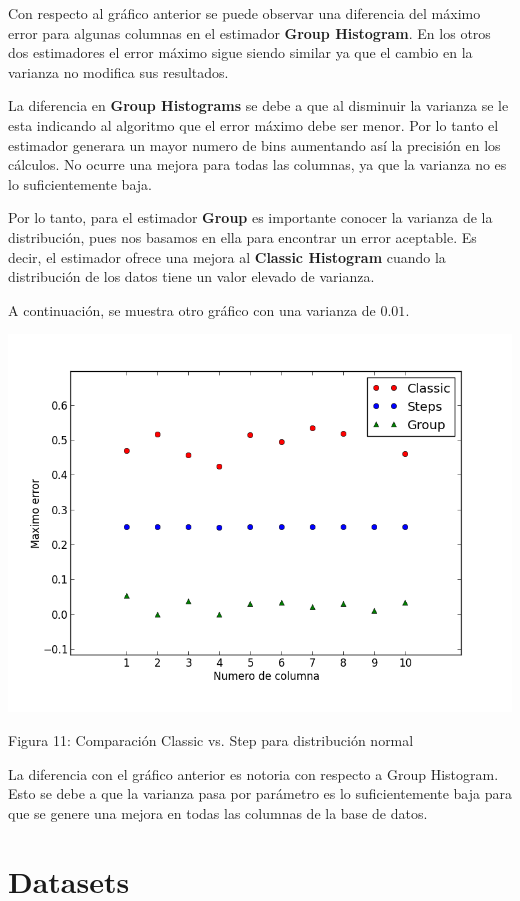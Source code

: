 \documentclass[10pt, a4paper,english,spanish,hidelinks]{article}
\begin{document}
Con respecto al gráfico anterior se puede observar una diferencia del máximo error para algunas columnas en el estimador \textbf{Group Histogram}. En los otros dos estimadores el error máximo sigue siendo similar ya que el cambio en la varianza no modifica sus resultados. 

La diferencia en \textbf{Group Histograms} se debe a que al disminuir la varianza se le esta indicando al algoritmo que el error máximo debe ser menor. Por lo tanto el estimador generara un mayor numero de bins aumentando así la precisión en los cálculos. No ocurre una mejora para todas las columnas, ya que la varianza no es lo suficientemente baja. 

Por lo tanto, para el estimador \textbf{Group} es importante conocer la varianza de la distribución, pues nos
basamos en ella para encontrar un error aceptable. Es decir, el estimador ofrece una mejora al \textbf{Classic Histogram} cuando la distribución de los datos tiene un valor elevado de varianza.

A continuación, se muestra otro gráfico con una varianza de $0.01$.


\centerline{  \includegraphics[scale=0.7]{./imagenes/ejb2_normal_t_001.png}}
\centerline{Figura 11: Comparación Classic vs. Step para distribución normal}


La diferencia con el gráfico anterior es notoria con respecto a Group Histogram. Esto se debe a que la varianza pasa por parámetro es lo suficientemente baja para que se genere una mejora en todas las columnas de la base de datos. 


\newpage
\section{Datasets}
\end{document}
